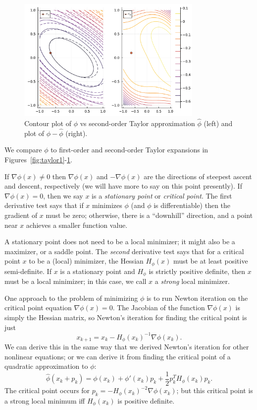 \documentclass[12pt, leqno]{article} %
\begin{document}
\begin{figure}
\begin{center}
  \includegraphics[width=0.8\textwidth]{fig/2023-03-31-taylor2.pdf}
\end{center}
\caption{Contour plot of $\phi$ vs second-order Taylor approximation $\hat{\phi}$ (left) and plot of $\phi-\hat{\phi}$ (right).}
\label{fig:taylor2}
\end{figure}

We compare $\phi$ to first-order and second-order Taylor expansions in
Figures~\ref{fig:taylor1}-\ref{fig:taylor2}.


If \(\nabla \phi(x) \neq 0\) then \(\nabla \phi(x)\) and
\(-\nabla \phi(x)\) are the directions of steepest ascent and descent,
respectively (we will have more to say on this point presently). If
\(\nabla \phi(x) = 0\), then we say \(x\) is a \emph{stationary point}
or \emph{critical point}. The first derivative test says that if \(x\)
minimizes \(\phi\) (and \(\phi\) is differentiable) then the gradient of
\(x\) must be zero; otherwise, there is a ``downhill'' direction, and a
point near \(x\) achieves a smaller function value.

A stationary point does not need to be a local minimizer; it might also
be a maximizer, or a saddle point. The \emph{second} derivative test
says that for a critical point \(x\) to be a (local) minimizer, the
Hessian \(H_{\phi}(x)\) must be at least positive semi-definite. If
\(x\) is a stationary point and \(H_{\phi}\) is strictly positive
definite, then \(x\) must be a local minimizer; in this case, we call
\(x\) a \emph{strong} local minimizer.

One approach to the problem of minimizing \(\phi\) is to run Newton
iteration on the critical point equation \(\nabla \phi(x) = 0\). The
Jacobian of the function \(\nabla \phi(x)\) is simply the Hessian
matrix, so Newton's iteration for finding the critical point is just
\[x_{k+1} = x_k - H_{\phi}(x_k)^{-1} \nabla \phi(x_k).\] We can derive
this in the same way that we derived Newton's iteration for other
nonlinear equations; or we can derive it from finding the critical point
of a quadratic approximation to \(\phi\): \[\hat{\phi}(x_k+p_k) =
  \phi(x_k) + \phi'(x_k) p_k + \frac{1}{2} p_k^T H_{\phi}(x_k) p_k.\]
The critical point occurs for
\(p_k = -H_{\phi}(x_k)^{-2} \nabla \phi(x_k)\); but this critical point
is a strong local minimum iff \(H_{\phi}(x_k)\) is positive definite.
\end{document}
